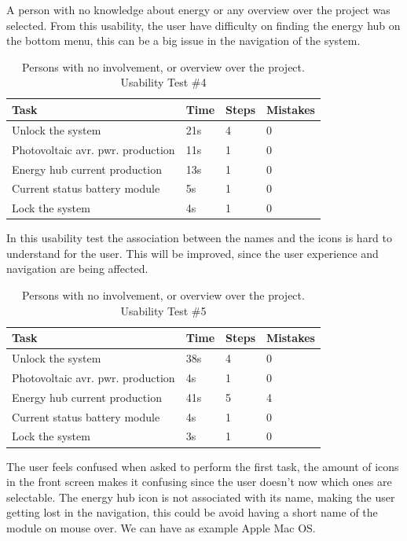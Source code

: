 A person with no knowledge about energy or any overview over the project was selected. From this usability, the user have difficulty on finding the energy hub on the bottom menu, this can be a big issue in the navigation of the system. 

\begin{table}[H]
\begin{tabular}{ | l | l | l | l |}
	\hline
	Task 					     &		Time 	& 	Steps 	& 	Mistakes 		\\ \hline
	Unlock the system 			     & 		21s		& 	4		& 	0			\\ \hline
	Photovoltaic avr. pwr. production  & 		11s		&	1		& 	0			\\ \hline
	Energy hub current production      & 		13s		& 	1		& 	0			\\ \hline
	Current status battery module 	     & 		5s		& 	1		& 	0			\\ \hline
	Lock the system 			     & 		4s		& 	1		& 	0			\\ \hline
\end{tabular}
\caption{Persons with no involvement, or overview over the project.  Usability Test \#4}
\end{table}

In this usability test the association between the names and the icons is hard to understand for the user. This will be improved, since the user experience and navigation are being affected.\\

\begin{table}[H]
\begin{tabular}{ | l | l | l | l |}
	\hline
	Task 					      & 	Time 	& 	Steps 	& 	Mistakes 		\\ \hline
	Unlock the system 			      & 	38s		& 	4		& 	0			\\ \hline
	Photovoltaic avr. pwr. production   &		4s	    	& 	1		& 	0			\\ \hline
	Energy hub current production 	      & 	41s		& 	5 		& 	4 			\\ \hline
	Current status battery module 	      & 	4s		& 	1		& 	0			\\ \hline
	Lock the system 			      & 	3s		& 	1		& 	0			\\ \hline
\end{tabular}
\caption{Persons with no involvement, or overview over the project. Usability Test \#5}
\end{table}

The user feels confused when asked to perform the first task, the amount of icons in the front screen makes it confusing since the user doesn't now which ones are selectable. The energy hub icon is not associated with its name, making the user getting lost in the navigation, this could be avoid having a short name of the module on mouse over. We can have as example Apple Mac OS.

